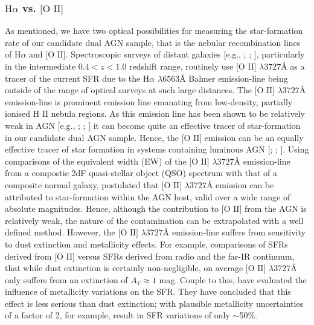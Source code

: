 \subsubsection{$\text{H}\alpha$ vs. $\text{[O II]}$}

As mentioned, we have two optical possibilities for measuring the star-formation rate of our candidate dual AGN sample, that is the nebular recombination lines of $\text{H}\alpha$ and $\text{[O II]}$. Spectroscopic surveys of distant galaxies [e.g., \cite{Lilly_1996}; \cite{Hippelein_2003}; \cite{Cardiel_2003}], particularly in the intermediate ${0.4}<{z}<{1.0}$ redshift range, routinely use $\text{[O II]}$ $\lambda{3727}Å$ as a tracer of the current SFR due to the $\text{H}\alpha$ $\lambda 6563Å$ Balmer emission-line being outside of the range of optical surveys at such large distances. The $\text{[O II]}$ $\lambda{3727}Å$ emission-line is prominent emission line emanating from low-density, partially ionised $\text{H II}$ nebula regions. As this emission line has been shown to be relatively weak in AGN [e.g., \cite{Ferland_1986}; \cite{Ho_1993}; \cite{Kim_2006}] it can become quite an effective tracer of star-formation in our candidate dual AGN sample. Hence, the $\text{[O II]}$ emission can be an equally effective tracer of star formation in systems containing luminous AGN [\cite{2006ApJ...642..702K}; \cite{Silverman_2009}; \cite{2012MNRAS.427.2401K}]. Using comparisons of the equivalent width (EW) of the $\text{[O II]}$  $\lambda{3727}Å$ emission-line from a compostie 2dF quasi-stellar object (QSO) spectrum with that of a composite normal galaxy, \cite{2002MNRAS.337..275C} postulated that $\text{[O II]}$ $\lambda{3727}Å$ emission can be attributed to star-formation within the AGN host, valid over a wide range of absolute magnitudes. Hence, although the contribution to $\text{[O II]}$ from the AGN is relatively weak, the nature of the contamination can be extrapolated with a well defined method. However, the $\text{[O II]}$ $\lambda{3727}Å$ emission-line suffers from sensitivity to dust extinction and metallicity effects. For example, comparisons of SFRs derived from [O II] versus SFRs derived from radio and the far-IR continuum, that while dust extinction is certainly non-negligible, on average $\text{[O II]}$ $\lambda{3727}Å$ only suffers from an extinction of $A_V\approx{1}$ mag. Couple to this, \cite{Kewley_2004} have evaluated the influence of metallicity variations on the SFR. They have concluded that this effect is less serious than dust extinction; with plausible metallicity uncertainties of a factor of 2, for example, result in SFR variations of only $\sim$50\%.

